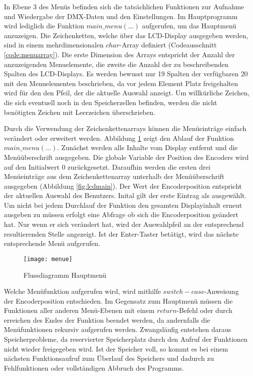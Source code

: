 In Ebene 3 des Menüs befinden sich die tatsächlichen Funktionen zur Aufnahme und Wiedergabe der DMX-Daten und den Einstellungen. Im Hauptprogramm wird lediglich die Funktion $main\_menu(...)$ aufgerufen, um das Hauptmenü anzuzeigen. Die Zeichenketten, welche über das LCD-Display ausgegeben werden, sind in einem mehrdimensionalen $char$-Array definiert (Codeausschnitt \ref{code:menuarray}). Die erste Dimension des Arrays entspricht der Anzahl der anzuzeigenden Menuelemente, die zweite die Anzahl der zu beschreibenden Spalten des LCD-Displays. Es werden bewusst nur 19 Spalten der verfügbaren 20 mit den Menuelementen beschrieben, da vor jedem Element Platz freigehalten wird für den den Pfeil, der die aktuelle Auswahl anzeigt. Um willkürliche Zeichen, die sich eventuell noch in den Speicherzellen befinden, werden die nicht benötigten Zeichen mit Leerzeichen überschrieben.

Durch die Verwendung der Zeichenkettenarrays können die Menüeinträge einfach verändert oder erweitert werden. Abbildung \ref{fig:flusshauptmenu} zeigt den Ablauf der Funktion $main\_menu(...)$. Zunächst werden alle Inhalte vom Display entfernt und die Menüüberschrift ausgegeben. Die globale Variable der Position des Encoders wird auf den Initialwert 0 zurückgesetzt. Daraufhin werden die ersten drei Menüeinträge aus dem Zeichenkettenarray unterhalb der Menüüberschrift ausgegeben (Abbildung \ref{fig:lcdmain}). Der Wert der Encoderposition entspricht der aktuellen Auswahl des Benutzers. Inital gilt der erste Eintrag als ausgewählt. Um nicht bei jedem Durchlauf der Funktion den gesamten Displayinhalt erneut ausgeben zu müssen erfolgt eine Abfrage ob sich die Encoderposition geändert hat. Nur wenn er sich verändert hat, wird der Auswahlpfeil an der entsprechend resultierenden Stelle angezeigt. Ist der Enter-Taster betätigt, wird das nächste entsprechende Menü aufgerufen.
\begin{figure}[h]
	\centering
	\texttt{[image: menue]}
	\caption{Flussdiagramm Hauptmenü}
	\label{fig:flusshauptmenu}
\end{figure}
Welche Menüfunktion aufgerufen wird, wird mithilfe $switch-case$-Anweisung der Encoderposition entschieden. Im Gegensatz zum Hauptmenü müssen die Funktionen aller anderen Menü-Ebenen mit einem $return$-Befehl oder durch erreichen des Endes der Funktion beendet werden, da andernfalls die Menüfunktionen rekursiv aufgerufen werden. Zwangsläufig entstehen daraus Speicherprobleme, da reservierter Speicherplatz durch den Aufruf der Funktionen nicht wieder freigegeben wird. Ist der Speicher voll, so kommt es bei einem nächsten Funktionsaufruf zum Überlauf des Speichers und dadurch zu Fehlfunktionen oder vollständigen Abbruch des Programms.